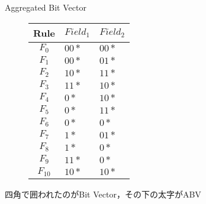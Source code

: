 \documentclass[a4paper,10pt]{jarticle}
\begin{document}
\begin{frame}{Aggregated Bit Vector}

\vspace{-10mm}

\begin{figure}[h]
 \def\@captype{table}
 \begin{minipage}[t]{.3\textwidth}
  {\footnotesize
  {\centering
 \begin{tabular}{c|l|l}
  Rule    & $Field_{1}$ & $Field_{2}$ \\ \hline
  $F_{0}$ & $00*$       & $00*$ \\ \hline
  $F_{1}$ & $00*$       & $01*$ \\ \hline
  $F_{2}$ & $10*$       & $11*$ \\ \hline
  $F_{3}$ & $11*$       & $10*$ \\ \hline
  $F_{4}$ & $0*$        & $10*$ \\ \hline
  $F_{5}$ & $0*$        & $11*$ \\ \hline
  $F_{6}$ & $0*$        & $0*$  \\ \hline
  $F_{7}$ & $1*$        & $01*$ \\ \hline
  $F_{8}$ & $1*$        & $0*$  \\ \hline
  $F_{9}$ & $11*$       & $0*$  \\ \hline
  $F_{10}$ & $10*$       & $10*$
 \end{tabular}

  }
  }
  \end{minipage}
  \hfill
  \begin{minipage}[c]{.6\textwidth}
   \vspace{8mm}
   \scalebox{0.45}{}
  \end{minipage}
\end{figure}

{\centering
四角で囲われたのがBit Vector，その下の太字がABV

}

\end{frame}
\end{document}
